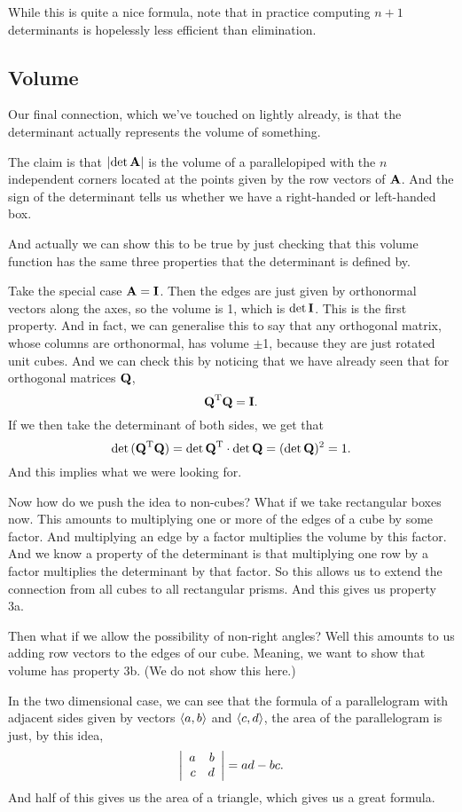 While this is quite a nice formula, note that in practice computing $n+1$ determinants is hopelessly less efficient than elimination.

\subsection{Volume}

Our final connection, which we've touched on lightly already, is that the determinant actually represents the volume of something. 

The claim is that $|\mathrm{det}\, \boldsymbol{\mathbf{A}}|$ is the volume of a parallelopiped with the $n$ independent corners located at the points given by the row vectors of $\boldsymbol{\mathbf{A}}$. And the sign of the determinant tells us whether we have a right-handed or left-handed box. 

And actually we can show this to be true by just checking that this volume function has the same three properties that the determinant is defined by. 

Take the special case $\boldsymbol{\mathbf{A}}=\boldsymbol{\mathbf{I}}$. Then the edges are just given by orthonormal vectors along the axes, so the volume is 1, which is $\mathrm{det}\, \boldsymbol{\mathbf{I}}$. This is the first property. And in fact, we can generalise this to say that any orthogonal matrix, whose columns are orthonormal, has volume $\pm$1, because they are just rotated unit cubes. And we can check this by noticing that we have already seen that for orthogonal matrices $\boldsymbol{\mathbf{Q}}$,
\[ \boldsymbol{\mathbf{Q}}^\mathrm{T}\boldsymbol{\mathbf{Q}} = \boldsymbol{\mathbf{I}}. \]
If we then take the determinant of both sides, we get that
\[ \mathrm{det}\, (\boldsymbol{\mathbf{Q}}^\mathrm{T}\boldsymbol{\mathbf{Q}}) = \mathrm{det}\, \boldsymbol{\mathbf{Q}}^\mathrm{T}\cdot \mathrm{det}\, \boldsymbol{\mathbf{Q}} = (\mathrm{det}\, \boldsymbol{\mathbf{Q}})^2 = 1. \]
And this implies what we were looking for. 

Now how do we push the idea to non-cubes? What if we take rectangular boxes now. This amounts to multiplying one or more of the edges of a cube by some factor. And multiplying an edge by a factor multiplies the volume by this factor. And we know a property of the determinant is that multiplying one row by a factor multiplies the determinant by that factor. So this allows us to extend the connection from all cubes to all rectangular prisms. And this gives us property 3a. 

Then what if we allow the possibility of non-right angles? Well this amounts to us adding row vectors to the edges of our cube. Meaning, we want to show that volume has property 3b. (We do not show this here.)

\bex
In the two dimensional case, we can see that the formula of a parallelogram with adjacent sides given by vectors $\langle a,b \rangle$ and $\langle c,d \rangle$, the area of the parallelogram is just, by this idea,
\[ \left| \begin{array}{rrrrrrrrrrrrrrrrrrrrrrrrr} a&b\\c&d\\ \end{array} \right| = ad-bc. \]
And half of this gives us the area of a triangle, which gives us a great formula. 
\eex
